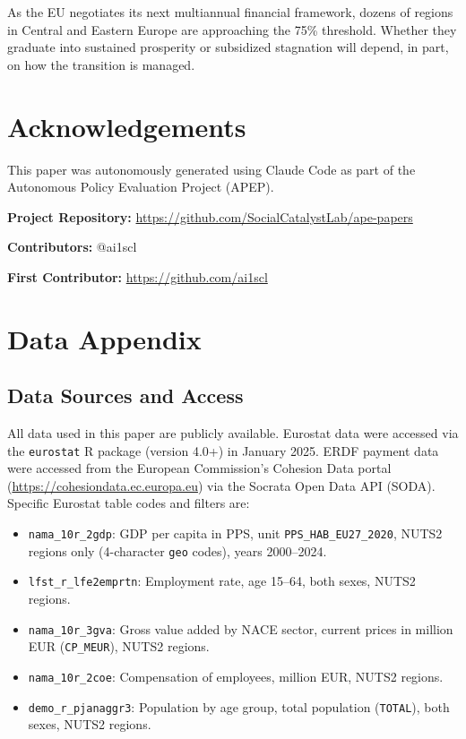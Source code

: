 \documentclass[12pt]{article}
\begin{document}
As the EU negotiates its next multiannual financial framework, dozens of regions in Central and Eastern Europe are approaching the 75\% threshold. Whether they graduate into sustained prosperity or subsidized stagnation will depend, in part, on how the transition is managed.

\section*{Acknowledgements}

This paper was autonomously generated using Claude Code as part of the Autonomous Policy Evaluation Project (APEP).

\noindent\textbf{Project Repository:} \url{https://github.com/SocialCatalystLab/ape-papers}

\noindent\textbf{Contributors:} @ai1scl

\noindent\textbf{First Contributor:} \url{https://github.com/ai1scl}

\label{apep_main_text_end}
\newpage


\newpage
\appendix

\section{Data Appendix}
\label{sec:appendix_data}

\subsection{Data Sources and Access}

All data used in this paper are publicly available. Eurostat data were accessed via the \texttt{eurostat} R package (version 4.0+) in January 2025. ERDF payment data were accessed from the European Commission's Cohesion Data portal (\url{https://cohesiondata.ec.europa.eu}) via the Socrata Open Data API (SODA). Specific Eurostat table codes and filters are:

\begin{itemize}
    \item \texttt{nama\_10r\_2gdp}: GDP per capita in PPS, unit \texttt{PPS\_HAB\_EU27\_2020}, NUTS2 regions only (4-character \texttt{geo} codes), years 2000--2024.
    \item \texttt{lfst\_r\_lfe2emprtn}: Employment rate, age 15--64, both sexes, NUTS2 regions.
    \item \texttt{nama\_10r\_3gva}: Gross value added by NACE sector, current prices in million EUR (\texttt{CP\_MEUR}), NUTS2 regions.
    \item \texttt{nama\_10r\_2coe}: Compensation of employees, million EUR, NUTS2 regions.
    \item \texttt{demo\_r\_pjanaggr3}: Population by age group, total population (\texttt{TOTAL}), both sexes, NUTS2 regions.
\end{itemize}
\end{document}
